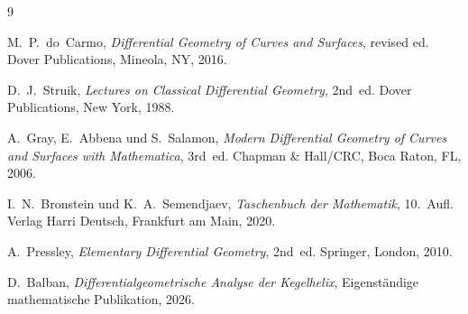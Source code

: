 \documentclass[12pt,a4paper]{article}
\theoremstyle{plain}
\theoremstyle{definition}
\theoremstyle{remark}
\begin{document}
\appendix


\begin{thebibliography}{9}

M.~P.~do~Carmo,
\textit{Differential Geometry of Curves and Surfaces}, revised ed.
Dover Publications, Mineola, NY, 2016.

D.~J.~Struik,
\textit{Lectures on Classical Differential Geometry}, 2nd~ed.
Dover Publications, New York, 1988.

A.~Gray, E.~Abbena und S.~Salamon,
\textit{Modern Differential Geometry of Curves and Surfaces with Mathematica}, 3rd~ed.
Chapman \& Hall/CRC, Boca Raton, FL, 2006.

I.~N.~Bronstein und K.~A.~Semendjaev,
\textit{Taschenbuch der Mathematik}, 10.~Aufl.
Verlag Harri Deutsch, Frankfurt am Main, 2020.

A.~Pressley,
\textit{Elementary Differential Geometry}, 2nd~ed.
Springer, London, 2010.

D.~Balban,
\textit{Differentialgeometrische Analyse der Kegelhelix},
Eigenst\"{a}ndige mathematische Publikation, 2026.

\end{thebibliography}
\end{document}
